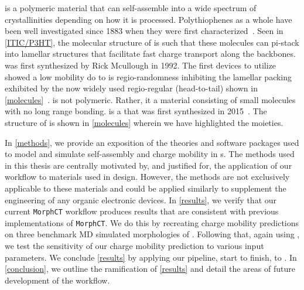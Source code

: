  is a polymeric material that can self-assemble into a wide spectrum of
crystallinities depending on how it is processed.
Polythiophenes as a whole have been well investigated 
since 1883 when they were first characterized~\cite{Poelking2014}.
Seen in \autoref{ITIC/P3HT}, the molecular structure of 
is such that these molecules can pi-stack into lamellar structures that facilitate fast charge transport along
the backbones.  was first synthesized by Rick Mcullough in 1992. The first devices to utilize  showed
a low mobility do to is regio-randomness inhibiting the lamellar packing exhibited by the now widely used
regio-regular (head-to-tail)  shown in \autoref{molecules}~\cite{Zaumseil2014}. 
 is not polymeric. Rather, it a material consisting of small molecules with no long range bonding.
 is a  that was first synthesized in 2015~\cite{Bai201U}. The structure of  is shown in
\autoref{molecules} wherein we have highlighted the moieties.  

In \autoref{methods}, we
provide an exposition of the theories and software packages used to model and simulate self-assembly and
charge mobility in
s.
The methods used in this thesis are centrally motivated by, and justified for, 
the application of our workflow to materials
used in  design. However, the methods are
not exclusively applicable to these materials and could be applied similarly to supplement the engineering of any organic
electronic devices. 
In \autoref{results}, we verify that our current \texttt{MorphCT} workflow produces results that are consistent with previous implementations of \texttt{MorphCT}. We do this by recreating charge mobility predictions on three benchmark MD simulated morphologies of . 
Following that, again using , we test the sensitivity of our charge mobility prediction to various input parameters. We conclude \autoref{results} by applying our pipeline,
start to finish, to . 
In \autoref{conclusion}, we outline the ramification of \autoref{results} and detail the areas of future development of the workflow. 

